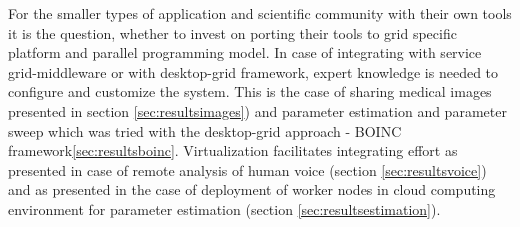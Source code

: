 For the smaller types of application and scientific community with their own tools it is the question, whether to invest on porting their tools to grid specific platform and parallel programming model. 
In case of integrating with service grid-middleware or with desktop-grid framework, expert knowledge is needed to configure and customize the system. This is the case of sharing medical images presented in section \ref{sec:resultsimages}) and parameter estimation and parameter sweep which was tried with the desktop-grid approach - BOINC framework\ref{sec:resultsboinc}. %
Virtualization facilitates integrating effort as presented in case of remote analysis of human voice (section \ref{sec:resultsvoice}) and as presented in the case of deployment of worker nodes in cloud computing environment for parameter estimation (section \ref{sec:resultsestimation}). %

